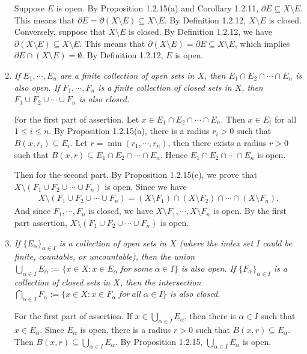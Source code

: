 \documentclass{book}
\begin{document}
\begin{enumerate}
    Suppose $E$ is open. By Proposition 1.2.15(a) and Corollary 1.2.11, $\partial E\subseteq X\setminus E$. This means that $\partial E=\partial(X\setminus E)\subseteq X\setminus E$. By Definition 1.2.12, $X\setminus E$ is closed. Conversely, suppose that $X\setminus E$ is closed. By Definition 1.2.12, we have $\partial(X\setminus E)\subseteq X\setminus E$. This means that $\partial(X\setminus E)=\partial E\subseteq X\setminus E$, which implies $\partial E\cap(X\setminus E)=\emptyset$. By Definition 1.2.12, $E$ is open.

    \item \emph{If $E_1,\cdots,E_n$ are a finite collection of open sets in $X$, then $E_1\cap E_2\cap\cdots\cap E_n$ is also open. If $F_1,\cdots,F_n$ is a finite collection of closed sets in $X$, then $F_1\cup F_2\cup\cdots\cup F_n$ is also closed.}

    For the first part of assertion. Let $x\in E_1\cap E_2\cap\cdots\cap E_n$. Then $x\in E_i$ for all $1\leq i\leq n$. By Proposition 1.2.15(a), there is a radius $r_i>0$ such that $B(x,r_i)\subseteq E_i$. Let $r=\min(r_1,\cdots,r_n)$, then there exists a radius $r>0$ such that $B(x,r)\subseteq E_1\cap E_2\cap\cdots\cap E_n$. Hence $E_1\cap E_2\cap\cdots\cap E_n$ is open.

    Then for the second part. By Proposition 1.2.15(e), we prove that $X\setminus(F_1\cup F_2\cup\cdots\cup F_n)$ is open. Since we have
        \begin{align*}
            X\setminus(F_1\cup F_2\cup\cdots\cup F_n)=(X\setminus F_1)\cap(X\setminus F_2)\cap\cdots\cap(X\setminus F_n).
        \end{align*}
    And since $F_1,\cdots,F_n$ is closed, we have $X\setminus F_1,\cdots,X\setminus F_n$ is open. By the first part assertion, $X\setminus(F_1\cup F_2\cup\cdots\cup F_n)$ is open.

    \item \emph{If $\{E_\alpha\}_{\alpha\in I}$ is a collection of open sets in $X$ (where the index set $I$ could be finite, countable, or uncountable), then the union $\bigcup_{\alpha\in I}E_\alpha:=\{x\in X:x\in E_\alpha\ for\ some\ \alpha\in I\}$ is also open. If $\{F_\alpha\}_{\alpha\in I}$ is a collection of closed sets in $X$, then the intersection $\bigcap_{\alpha\in I}F_\alpha:=\{x\in X:x\in F_\alpha\ for\ all\ \alpha\in I\}$ is also closed.}

    For the first part of assertion. If $x\in\bigcup_{\alpha\in I}E_\alpha$, then there is $\alpha\in I$ such that $x\in E_\alpha$. Since $E_\alpha$ is open, there is a radius $r>0$ such that $B(x,r)\subseteq E_\alpha$. Then $B(x,r)\subseteq\bigcup_{\alpha\in I}E_\alpha$. By Proposition 1.2.15, $\bigcup_{\alpha\in I}E_\alpha$ is open.


\end{enumerate}
\end{document}
